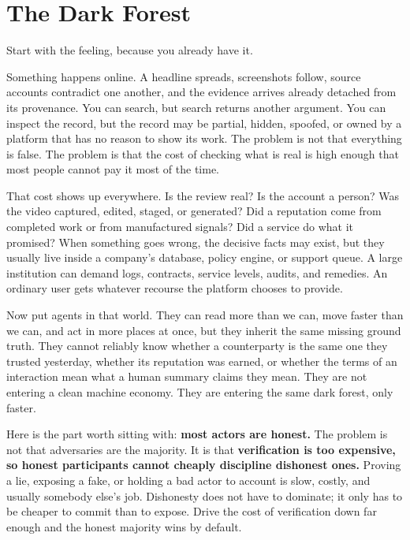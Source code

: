 \documentclass[11pt,a4paper]{article}
\begin{document}
\tableofcontents
\newpage

\section{The Dark Forest}

Start with the feeling, because you already have it.

Something happens online. A headline spreads, screenshots follow, source accounts contradict one another, and the evidence arrives already detached from its provenance. You can search, but search returns another argument. You can inspect the record, but the record may be partial, hidden, spoofed, or owned by a platform that has no reason to show its work. The problem is not that everything is false. The problem is that the cost of checking what is real is high enough that most people cannot pay it most of the time.

That cost shows up everywhere. Is the review real? Is the account a person? Was the video captured, edited, staged, or generated? Did a reputation come from completed work or from manufactured signals? Did a service do what it promised? When something goes wrong, the decisive facts may exist, but they usually live inside a company's database, policy engine, or support queue. A large institution can demand logs, contracts, service levels, audits, and remedies. An ordinary user gets whatever recourse the platform chooses to provide.

Now put agents in that world. They can read more than we can, move faster than we can, and act in more places at once, but they inherit the same missing ground truth. They cannot reliably know whether a counterparty is the same one they trusted yesterday, whether its reputation was earned, or whether the terms of an interaction mean what a human summary claims they mean. They are not entering a clean machine economy. They are entering the same dark forest, only faster.

Here is the part worth sitting with: \textbf{most actors are honest.} The problem is not that adversaries are the majority. It is that \textbf{verification is too expensive, so honest participants cannot cheaply discipline dishonest ones.} Proving a lie, exposing a fake, or holding a bad actor to account is slow, costly, and usually somebody else's job. Dishonesty does not have to dominate; it only has to be cheaper to commit than to expose. Drive the cost of verification down far enough and the honest majority wins by default.
\end{document}

